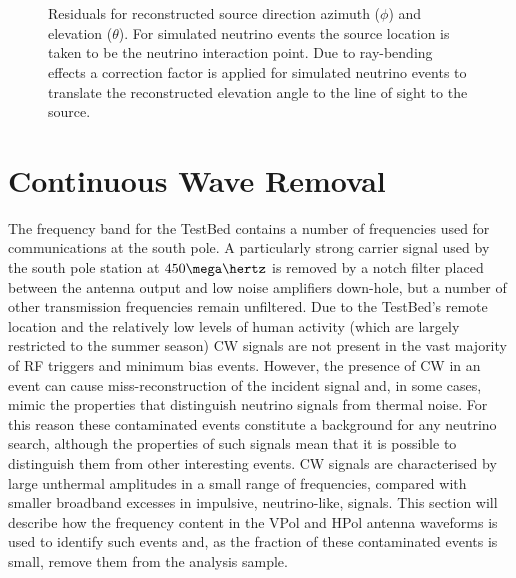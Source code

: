 \begin{figure}[htpb]
  \hfill
  \\
  \hfill
  \\
  \hfill
  \caption{Residuals for reconstructed source direction azimuth ($\phi$) and elevation ($\theta$). For simulated neutrino events the source location is taken to be the neutrino interaction point. Due to ray-bending effects a correction factor is applied for simulated neutrino events to translate the reconstructed elevation angle to the line of sight to the source.}
  \label{fig:analysis:Reconstructed:CSW-Residuals}
\end{figure}

\section{Continuous Wave Removal}
\label{sec:Analysis:CWRemoval}

The frequency band for the TestBed contains a number of frequencies used for communications at the south pole. A particularly strong carrier signal used by the south pole station at $450 \mega \hertz$ is removed by a notch filter placed between the antenna output and low noise amplifiers down-hole, but a number of other transmission frequencies remain unfiltered. Due to the TestBed's remote location and the relatively low levels of human activity (which are largely restricted to the summer season) CW signals are not present in the vast majority of RF triggers and minimum bias events. However, the presence of CW in an event can cause miss-reconstruction of the incident signal and, in some cases, mimic the properties that distinguish neutrino signals from thermal noise. For this reason these contaminated events constitute a background for any neutrino search, although the properties of such signals mean that it is possible to distinguish them from other interesting events. CW signals are characterised by large unthermal amplitudes in a small range of frequencies, compared with smaller broadband excesses in impulsive, neutrino-like, signals. This section will describe how the frequency content in the VPol and HPol antenna waveforms is used to identify such events and, as the fraction of these contaminated events is small, remove them from the analysis sample.


